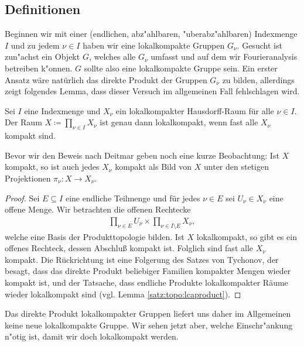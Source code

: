 \subsection{Definitionen}\label{kapitel:RDP}
		Beginnen wir mit einer (endlichen, abz"ahlbaren, "uberabz"ahlbaren) Indexmenge $I$ und zu jedem $\nu\in I$ haben wir eine lokalkompakte Gruppen $G_\nu$.
		Gesucht ist zun"achst ein Objekt $G$, welches alle $G_\nu$ umfasst und auf dem wir Fourieranalysis betreiben k"onnen.
		$G$ sollte also eine lokalkompakte Gruppe sein.
		Ein erster Ansatz wäre natürlich das direkte Produkt der Gruppen $G_\nu$ zu bilden, allerdings zeigt folgendes Lemma, dass dieser Versuch im allgemeinen Fall fehlschlagen wird.
		\begin{lemma}\label{Lemma:lokalkompaktProd}
			Sei $I$ eine Indexmenge und $X_\nu$ ein lokalkompakter Hausdorff-Raum für alle $\nu \in I$. Der Raum $X\coloneqq \prod_{\nu \in I} X_\nu$ ist genau dann lokalkompakt, wenn fast alle $X_\nu$ kompakt sind.
		\end{lemma}
		Bevor wir den Beweis nach Deitmar \cite{deitmar2010} geben noch eine kurze Beobachtung: Ist $X$ kompakt, so ist auch jedes $X_\nu$ kompakt als Bild von $X$ unter den stetigen Projektionen $\pi_\nu:X \to X_\nu$.
		\begin{proof}
			Sei $E \subseteq I$ eine endliche Teilmenge und für jedes $\nu\in E$ sei $U_\nu \in X_\nu$ eine offene Menge. Wir betrachten die offenen Rechtecke
			\begin{align*}
				\prod_{\nu\in E} U_\nu \times \prod_{\nu\in I\setminus E} X_\nu,
			\end{align*}
			welche eine Basis der Produkttopologie bilden. 
			Ist $X$ lokalkompakt, so gibt es ein offenes Rechteck, dessen Abschluß kompakt ist. 
			Folglich sind fast alle $X_\nu$ kompakt. 
			Die Rückrichtung ist eine Folgerung des Satzes von Tychonov, der besagt, dass das direkte Produkt beliebiger Familien kompakter Mengen wieder kompakt ist, und der Tatsache, dass endliche Produkte lokalkompakter Räume wieder lokalkompakt sind (vgl. Lemma \ref{satz:topo:lcaproduct}).
		\end{proof}
		Das direkte Produkt lokalkompakter Gruppen liefert uns daher im Allgemeinen keine neue lokalkompakte Gruppe. 
		Wir sehen jetzt aber, welche Einschr"ankung n"otig ist, damit wir doch lokalkompakt werden.
